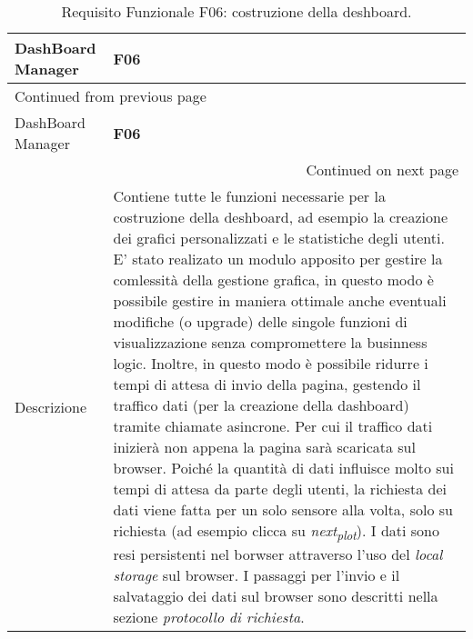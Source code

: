 \documentclass[onecolumn,a4paper]{article}
\begin{document}
\begin{longtable}{|p{3cm}|p{10cm}|}
\caption{Requisito Funzionale F06: costruzione della deshboard.}
\\
\cellcolor{grey!15}DashBoard Manager & \cellcolor{grey!15} \textbf{F06}\\
\hline
\endfirsthead
\multicolumn{2}{l}{Continued from previous page} \\
\hline

\cellcolor{grey!15}DashBoard Manager & \cellcolor{grey!15} \textbf{F06} \\

\hline
\endhead
\hline\multicolumn{2}{r}{Continued on next page} \\
\endfoot
\endlastfoot
\hline
Descrizione & Contiene tutte le funzioni necessarie per la costruzione della deshboard, ad esempio la creazione dei grafici personalizzati e le statistiche degli utenti. E' stato realizato un modulo apposito per gestire la comlessità della gestione grafica, in questo modo è possibile gestire in maniera ottimale anche eventuali modifiche (o upgrade) delle singole funzioni di visualizzazione senza compromettere la businness logic. Inoltre, in questo modo è possibile ridurre i tempi di attesa di invio della pagina, gestendo il traffico dati (per la creazione della dashboard) tramite chiamate asincrone. Per cui il traffico dati inizierà non appena la pagina sarà scaricata sul browser. Poiché la quantità di dati influisce molto sui tempi di attesa da parte degli utenti, la richiesta dei dati viene fatta per un solo sensore alla volta, solo su richiesta (ad esempio clicca su \emph{next\textsubscript{plot}}). I dati sono resi persistenti nel borwser attraverso l'uso del \emph{local storage} sul browser. I passaggi per l'invio e il salvataggio dei dati sul browser sono descritti nella sezione \emph{protocollo di richiesta}.\\
\hline

\end{longtable}
\end{document}
